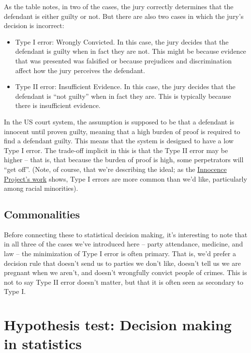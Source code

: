 \documentclass[
  letterpaper,
  DIV=11,
  numbers=noendperiod]{scrreprt}
\providecommand{\tightlist}{%
  \setlength{\itemsep}{0pt}\setlength{\parskip}{0pt}}\usepackage{longtable,booktabs,array}
\theoremstyle{definition}
\theoremstyle{remark}
\begin{document}
As the table notes, in two of the cases, the jury correctly determines
that the defendant is either guilty or not. But there are also two cases
in which the jury's decision is incorrect:

\begin{itemize}
\tightlist
\item
  Type I error: Wrongly Convicted. In this case, the jury decides that
  the defendant is guilty when in fact they are not. This might be
  because evidence that was presented was falsified or because
  prejudices and discrimination affect how the jury perceives the
  defendant.
\item
  Type II error: Insufficient Evidence. In this case, the jury decides
  that the defendant is ``not guilty'' when in fact they are. This is
  typically because there is insufficient evidence.
\end{itemize}

In the US court system, the assumption is supposed to be that a
defendant is innocent until proven guilty, meaning that a high burden of
proof is required to find a defendant guilty. This means that the system
is designed to have a low Type I error. The trade-off implicit in this
is that the Type II error may be higher -- that is, that because the
burden of proof is high, some perpetrators will ``get off''. (Note, of
course, that we're describing the ideal; as the
\href{https://www.innocenceproject.org}{Innocence Project's work} shows,
Type I errors are more common than we'd like, particularly among racial
minorities).

\hypertarget{commonalities}{%
\subsection{Commonalities}\label{commonalities}}

Before connecting these to statistical decision making, it's interesting
to note that in all three of the cases we've introduced here -- party
attendance, medicine, and law -- the minimization of Type I error is
often primary. That is, we'd prefer a decision rule that doesn't send us
to parties we don't like, doesn't tell us we are pregnant when we
aren't, and doesn't wrongfully convict people of crimes. This is not to
say Type II error doesn't matter, but that it is often seen as secondary
to Type I.

\hypertarget{sec-ht}{%
\section{Hypothesis test: Decision making in statistics}\label{sec-ht}}
\end{document}
